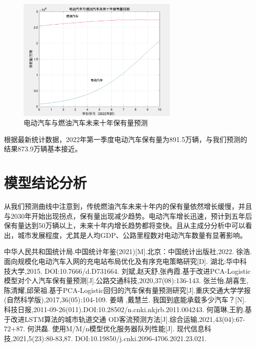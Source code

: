 \documentclass[12pt, a4paper, oneside]{ctexart}
\begin{document}
\begin{figure}[H]
  \centering
  \includegraphics[width=0.7\textwidth]{pic/911652953505_.pic.jpg}
  \caption{电动汽车与燃油汽车未来十年保有量预测}
  \label{fig:电动汽车与燃油汽车未来十年保有量预测}
\end{figure}

根据最新统计数据，2022年第一季度电动汽车保有量为891.5万辆，与我们预测的结果873.9万辆基本接近。




\section{模型结论分析}


从我们预测曲线中注意到，传统燃油汽车未来十年内的保有量依然增长缓慢，并且与2030年开始出现拐点，保有量出现减少趋势。电动汽车增长迅速，预计到五年后保有量达到50万辆以上，未来十年内增长趋势都将变快。且从主成分分析中可以看出，城市发展程度，尤其是人均GDP、公路里程数对电动汽车数量有显著影响。



\begin{thebibliography}{99}
    中华人民共和国统计局.中国统计年鉴(2021)[M].北京：中国统计出版社,2022.
    徐浩. 面向规模化电动汽车入网的充电站布局优化及有序充电策略研究[D]. 湖北:华中科技大学,2015. DOI:10.7666/d.D731664.
    刘斌,赵天舒,张冉霞.基于改进PCA-Logistic模型对个人汽车保有量预测[J].公路交通科技,2020,37(08):136-143.
    张兰怡,胡喜生,陈清耀,邱荣祖.基于PCA-Logistic回归的汽车保有量预测研究[J].重庆交通大学学报(自然科学版),2017,36(05):104-109.
    姜靖 ,戴慧兰. 我国到底能承载多少汽车？[N]. 科技日报,2011-09-26(011).DOI:10.28502/n.cnki.nkjrb.2011.004243.
    何蔼琳,王豹.基于改进LSTM算法的城市轨道交通	OD客流预测方法[J].综合运输,2021,43(04):67-72+87.
    何洪磊. 使用M/M/n模型优化服务器队列性能[J]. 现代信息科技,2021,5(23):80-83,87. DOI:10.19850/j.cnki.2096-4706.2021.23.021.

\end{thebibliography}
\end{document}

